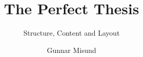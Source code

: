 \documentclass[
]{thesistemplate}
\affiliation{Høgskolen i Østfold}
\title{The Perfect Thesis} %
\subtitle{Structure, Content and Layout}
\author{Gunnar Misund}
\begin{document}
\maketitle          %
\makehalftitle      %
\frontmatter        %





\tableofcontents    %

\listoffigures      %
\listoftables       %
\lstlistoflistings  %
  
\mainmatter  %










\printglossaries            %

\appendix                   %
\end{document}
